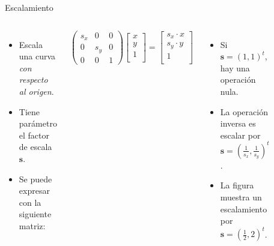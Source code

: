 \begin{frame}{Escalamiento}
\begin{columns}
\begin{itemize}
    \item Escala una curva \emph{con respecto al origen}.
    \item Tiene parámetro el factor de escala $\mathbf{s}$.
    \item Se puede expresar con la siguiente matriz:
\end{itemize}
$$
\begin{pmatrix}
s_x & 0 & 0 \\
0 & s_y & 0 \\
0 & 0 & 1
\end{pmatrix}
\begin{bmatrix}
x \\
y \\
1 \\
\end{bmatrix}
=
\begin{bmatrix}
s_x \cdot x  \\
s_y \cdot y  \\
1 \\
\end{bmatrix}
$$
\begin{itemize}
    \item Si $\mathbf{s} = ( 1 , 1 )^t$, hay una operación nula.
    \item La operación inversa es escalar por $\mathbf{s} = (\frac{1}{s_x} , \frac{1}{s_y} )^t$.
    \item La figura muestra un escalamiento por $\mathbf{s} = ( \frac{1}{2} , 2 )^t$.
\end{itemize}
\begin{figure}[htp]
 \centering
 \begin{subfigure}[b]{0.4\textwidth}
   \includegraphics[width=\textwidth]{img/Square}

\end{subfigure}
\end{figure}
\end{columns}
\end{frame}
